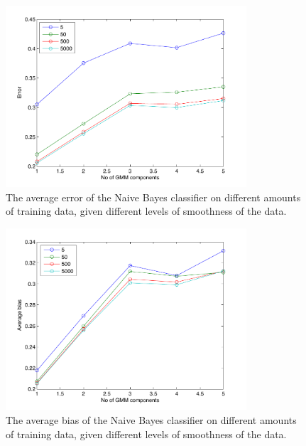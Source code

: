\documentclass[a4paper]{article}
\begin{document}
\begin{figure}[H!]
    \centering
    \includegraphics[width=0.8\textwidth]{nb_loss_1-5c.pdf}
    \caption{The average error of the Naive Bayes classifier on different amounts of training data, given different levels of smoothness of the data. \label{fig:nbloss}}
\end{figure}
\begin{figure}[H!]
    \centering
    \includegraphics[width=0.8\textwidth]{nb_bias_1-5c.pdf}
    \caption{The average bias of the Naive Bayes classifier on different amounts of training data, given different levels of smoothness of the data. \label{fig:nbbias}}
\end{figure}
\end{document}
